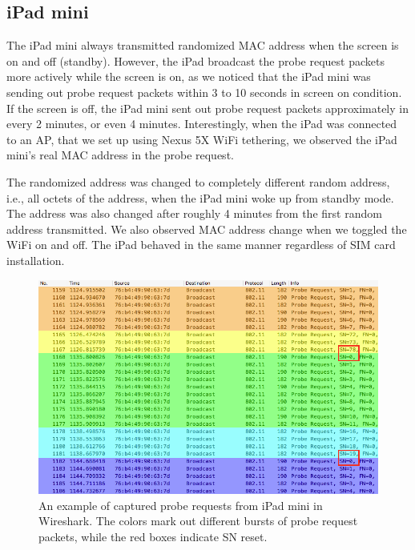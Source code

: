 	\subsection{iPad mini} %
	\label{sub:ipad_mini}
	The iPad mini always transmitted randomized \ac{MAC} address when the screen is on and off (standby). However, the iPad broadcast the probe request packets more actively while the screen is on, as we noticed that the iPad mini was sending out probe request packets within 3 to 10 seconds in screen on condition. If the screen is off, the iPad mini sent out probe request packets approximately in every 2 minutes, or even 4 minutes. Interestingly, when the iPad was connected to an \ac{AP}, that we set up using Nexus 5X WiFi tethering, we observed the iPad mini's real \ac{MAC} address in the probe request.

	The randomized address was changed to completely different random address, i.e., all octets of the address, when the iPad mini woke up from standby mode. The address was also changed after roughly 4 minutes from the first random address transmitted. We also observed \ac{MAC} address change when we toggled the WiFi on and off. The iPad behaved in the same manner regardless of \ac{SIM} card installation. 

	\begin{figure}[h]
		\centering
		\includegraphics[width=\textwidth]{./img/result/randomization/ipad-mini}
		\caption[Some examples of captured probe requests from iPad mini.]{An example of captured probe requests from iPad mini in Wireshark. The colors mark out different bursts of probe request packets, while the red boxes indicate \ac{SN} reset.}
		\label{fig:ipad-random}
	\end{figure}

